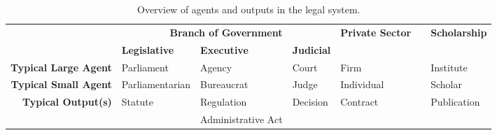 \documentclass[utf8,sort&compress,table,hidelinks]{frontiersFPHY} %
\begin{document}
\begin{table}
	\centering
	\renewcommand{\arraystretch}{1.5}
\small
    \begin{tabular}{rllllll}
		\toprule&\multicolumn{3}{c}{\bfseries Branch of Government}&\bfseries Private Sector&&\bfseries Scholarship\\
		&\bfseries Legislative & \bfseries Executive & \bfseries Judicial&&&\\\midrule
		\bfseries Typical Large Agent&Parliament&Agency&Court&Firm&&Institute\\
		\bfseries Typical Small Agent&Parliamentarian&Bureaucrat&Judge&Individual&&Scholar\\
		\bfseries Typical Output(s)&Statute&Regulation&Decision&Contract&&Publication\\[-6pt]
		&&Administrative Act&&\\
		\bottomrule
	\end{tabular}

	\caption{Overview of agents and outputs in the legal system.}\label{tab:legal-system}
\end{table}
\end{document}
